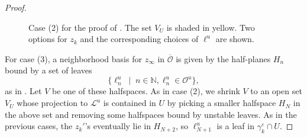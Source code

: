 \documentclass[10pt,a4paper]{amsart}
\newcommand{\N}{\mathbb{N}}
\newcommand{\mc}{\mathcal}
\newcommand{\orb}{\mathcal{O}}
\newcommand{\vep}{\varepsilon}
\begin{document}
\begin{proof}
		\begin{figure}[h]
		\centering
		
		\caption{Case (2) for the proof of . The set $V_U$ is shaded in yellow. Two options for $z_k$ and the corresponding choices of $\ell^u$ are shown.}\label{fig:linf_ray2}
	\end{figure}
	
	For case (3), a neighborhood basis for $z_\infty$ in $\overline{\orb}$ is given by the half-planes $H_n$ bound by a set of leaves 
	\[
	\{\ell^u_n\;\mid\;n\in\N,\ell^u_n\in\orb^u\},
	\] as in . Let $V$ be one of these halfspaces. As in case (2), we shrink $V$ to an open set $V_U$ whose projection to $\mc L^u$ is contained in $U$ by picking a smaller halfspace $H_N$ in the above set and removing some halfspaces bound by unstable leaves. As in the previous cases, the $z_k'$'s eventually lie in $H_{N+2}$, so $\ell^u_{N+1}$ is a leaf in $\gamma_k^\vep\cap U$.

\end{proof}
\end{document}
